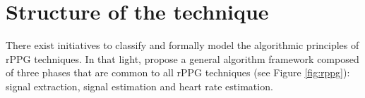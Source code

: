 

\section{Structure of the technique}
\label{s:literature-rppg-structure}

There exist initiatives to classify \parencite{rouast2016remote, mcduff2015survey} and formally model the algorithmic principles \parencite{Wang_2016algorithmic} of rPPG techniques. In that light, \textcite{rouast2016remote} propose a general algorithm framework composed of three phases that are common to all rPPG techniques (see Figure \ref{fig:rppg}): signal extraction, signal estimation and heart rate estimation.

